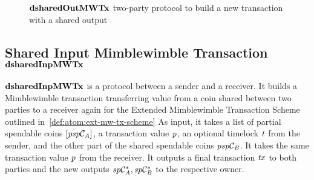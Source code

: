 \begin{figure}
    \begin{center}
    \end{center}
    \caption{$\mathbf{dsharedOutMWTx}$ two-party protocol to build a new transaction with a shared output} \label{fig:d-shared-out-mw-tx}
\end{figure}

\subsection{Shared Input Mimblewimble Transaction $\mathbf{dsharedInpMWTx}$} \label{subsec:atom:shared-inp-mw-tx}

$\mathbf{dsharedInpMWTx}$ is a protocol between a sender and a receiver.
It builds a Mimblewimble transaction transferring value from a coin shared between two parties to a receiver again for the Extended Mimblewimble Transaction Scheme outlined in~\cref{def:atom:ext-mw-tx-scheme}
As input, it takes a list of partial spendable coins $[\mathit{psp}\mathcal{C}_{\mathit{A}}]$, a transaction value $\mathit{p}$, an optional timelock $\mathit{t}$ from the sender, and the other part of the shared spendable coins $\mathit{psp}\mathcal{C}_{\mathit{B}}$.
It takes the same transaction value $\mathit{p}$ from the receiver.
It outputs a final transaction $\mathit{tx}$ to both parties and the new outputs $\mathit{sp}\mathcal{C}_{\mathit{A}}^*, \mathit{sp}\mathcal{C}_{\mathit{B}}^*$ to the respective owner.

